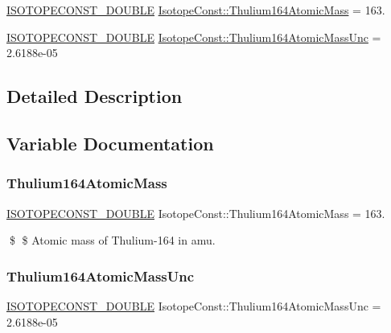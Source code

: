 \begin{DoxyCompactItemize}
\item 
\mbox{\hyperlink{group___isotope_const-_macros_ga8f45a7272ce02c0b4c65c44636ed719a}{I\+S\+O\+T\+O\+P\+E\+C\+O\+N\+S\+T\+\_\+\+D\+O\+U\+B\+LE}} \mbox{\hyperlink{group___isotope_const-_thulium-_tm164_ga36d2ec7d1839b47a5a5c817ffb260fea}{Isotope\+Const\+::\+Thulium164\+Atomic\+Mass}} = 163.
\item 
\mbox{\hyperlink{group___isotope_const-_macros_ga8f45a7272ce02c0b4c65c44636ed719a}{I\+S\+O\+T\+O\+P\+E\+C\+O\+N\+S\+T\+\_\+\+D\+O\+U\+B\+LE}} \mbox{\hyperlink{group___isotope_const-_thulium-_tm164_ga17e1f8da50a227ff745561da8d5d6234}{Isotope\+Const\+::\+Thulium164\+Atomic\+Mass\+Unc}} = 2.\+6188e-\/05
\end{DoxyCompactItemize}


\subsection{Detailed Description}


\subsection{Variable Documentation}
\mbox{\label{group___isotope_const-_thulium-_tm164_ga36d2ec7d1839b47a5a5c817ffb260fea}} 
\subsubsection{\texorpdfstring{Thulium164\+Atomic\+Mass}{Thulium164AtomicMass}}
{\footnotesize\ttfamily \mbox{\hyperlink{group___isotope_const-_macros_ga8f45a7272ce02c0b4c65c44636ed719a}{I\+S\+O\+T\+O\+P\+E\+C\+O\+N\+S\+T\+\_\+\+D\+O\+U\+B\+LE}} Isotope\+Const\+::\+Thulium164\+Atomic\+Mass = 163.}

\$ \$ Atomic mass of Thulium-\/164 in amu. \mbox{\label{group___isotope_const-_thulium-_tm164_ga17e1f8da50a227ff745561da8d5d6234}} 
\subsubsection{\texorpdfstring{Thulium164\+Atomic\+Mass\+Unc}{Thulium164AtomicMassUnc}}
{\footnotesize\ttfamily \mbox{\hyperlink{group___isotope_const-_macros_ga8f45a7272ce02c0b4c65c44636ed719a}{I\+S\+O\+T\+O\+P\+E\+C\+O\+N\+S\+T\+\_\+\+D\+O\+U\+B\+LE}} Isotope\+Const\+::\+Thulium164\+Atomic\+Mass\+Unc = 2.\+6188e-\/05}

